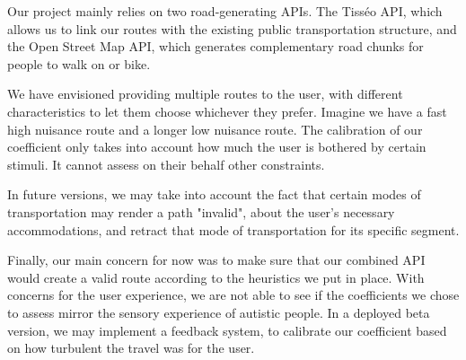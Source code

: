 Our project mainly relies on two road-generating APIs. The Tisséo API, which allows us to link our routes with the existing public transportation structure, and the Open Street Map API, which generates complementary road chunks for people to walk on or bike.
\newline

We have envisioned providing multiple routes to the user, with different characteristics to let them choose whichever they prefer. Imagine we have a fast high nuisance route and a longer low nuisance route. The calibration of our coefficient only takes into account how much the user is bothered by certain stimuli. It cannot assess on their behalf other constraints.
\newline

In future versions, we may take into account the fact that certain modes of transportation may render a path "invalid", about the user's necessary accommodations, and retract that mode of transportation for its specific segment.
\newline

Finally, our main concern for now was to make sure that our combined API would create a valid route according to the heuristics we put in place. With concerns for the user experience, we are not able to see if the coefficients we chose to assess mirror the sensory experience of autistic people. In a deployed beta version, we may implement a feedback system, to calibrate our coefficient based on how turbulent the travel was for the user.
